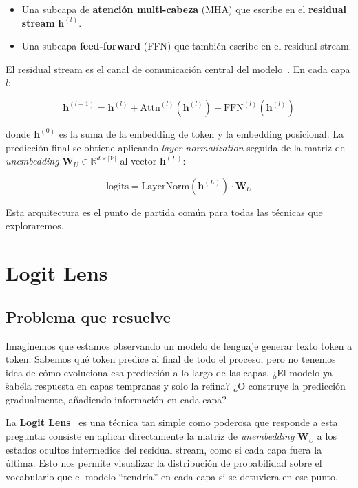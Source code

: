 \documentclass[11pt,a4paper]{report}
\theoremstyle{definition}
\begin{document}
\begin{itemize}
    \item Una subcapa de \textbf{atención multi-cabeza} (MHA) que escribe en el \textbf{residual stream} $\mathbf{h}^{(l)}$.
    \item Una subcapa \textbf{feed-forward} (FFN) que también escribe en el residual stream.
\end{itemize}

El residual stream es el canal de comunicación central del modelo~\cite{elhage2021mathematical}. En cada capa $l$:

\[
\mathbf{h}^{(l+1)} = \mathbf{h}^{(l)} + \text{Attn}^{(l)}(\mathbf{h}^{(l)}) + \text{FFN}^{(l)}(\mathbf{h}^{(l)})
\]

donde $\mathbf{h}^{(0)}$ es la suma de la embedding de token y la embedding posicional. La predicción final se obtiene aplicando \emph{layer normalization} seguida de la matriz de \emph{unembedding} $\mathbf{W}_U \in \mathbb{R}^{d \times |\mathcal{V}|}$ al vector $\mathbf{h}^{(L)}$:

\[
\text{logits} = \text{LayerNorm}(\mathbf{h}^{(L)}) \cdot \mathbf{W}_U
\]

Esta arquitectura es el punto de partida común para todas las técnicas que exploraremos.

\newpage

\chapter{Logit Lens}
\label{ch:logit-lens}

\section{Problema que resuelve}

Imaginemos que estamos observando un modelo de lenguaje generar texto token a token. Sabemos qué token predice al final de todo el proceso, pero no tenemos idea de cómo evoluciona esa predicción a lo largo de las capas. ¿El modelo ya \"sabe\" la respuesta en capas tempranas y solo la refina? ¿O construye la predicción gradualmente, añadiendo información en cada capa?

La \textbf{Logit Lens}~\cite{nostalgebraist2020logitlens} es una técnica tan simple como poderosa que responde a esta pregunta: consiste en aplicar directamente la matriz de \emph{unembedding} $\mathbf{W}_U$ a los estados ocultos intermedios del residual stream, como si cada capa fuera la última. Esto nos permite visualizar la distribución de probabilidad sobre el vocabulario que el modelo ``tendría'' en cada capa si se detuviera en ese punto.
\end{document}
